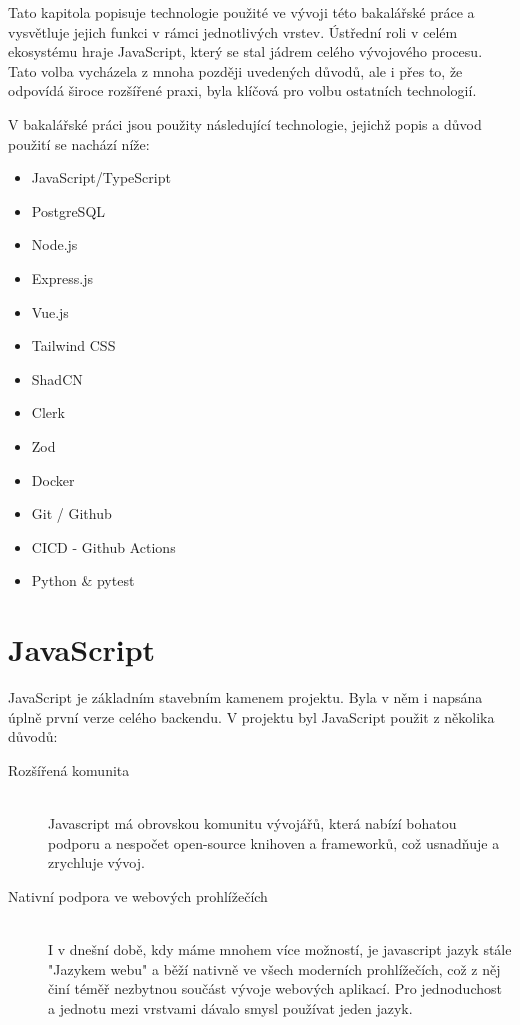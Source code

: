 Tato kapitola popisuje technologie použité ve vývoji této bakalářské práce a vysvětluje jejich funkci v rámci jednotlivých vrstev. Ústřední roli v celém ekosystému hraje JavaScript, který se stal jádrem celého vývojového procesu. Tato volba vycházela z mnoha později uvedených důvodů, ale i přes to, že odpovídá široce rozšířené praxi, byla klíčová pro volbu ostatních technologií.

V bakalářské práci jsou použity následující technologie, jejichž popis a důvod použití se nachází níže:
\begin{itemize}
    \item JavaScript/TypeScript
    \item PostgreSQL
    \item Node.js
    \item Express.js
    \item Vue.js
    \item Tailwind CSS
    \item ShadCN
    \item Clerk
    \item Zod
    \item Docker
    \item Git / Github
    \item CICD - Github Actions
    \item Python \& pytest
\end{itemize}

\section{JavaScript}
JavaScript je základním stavebním kamenem projektu. Byla v něm i napsána úplně první verze celého backendu. V projektu byl JavaScript použit z několika důvodů:

\begin{description}
  \item[Rozšířená komunita] \hfill \\ Javascript má obrovskou komunitu vývojářů, která nabízí bohatou podporu a nespočet open-source knihoven a frameworků, což usnadňuje a zrychluje vývoj.
  \item[Nativní podpora ve webových prohlížečích] \hfill \\ I v dnešní době, kdy máme mnohem více možností, je javascript jazyk stále "Jazykem webu" a běží nativně ve všech moderních prohlížečích, což z něj činí téměř nezbytnou součást vývoje webových aplikací. Pro jednoduchost a jednotu mezi vrstvami dávalo smysl používat jeden jazyk.
\end{description}

